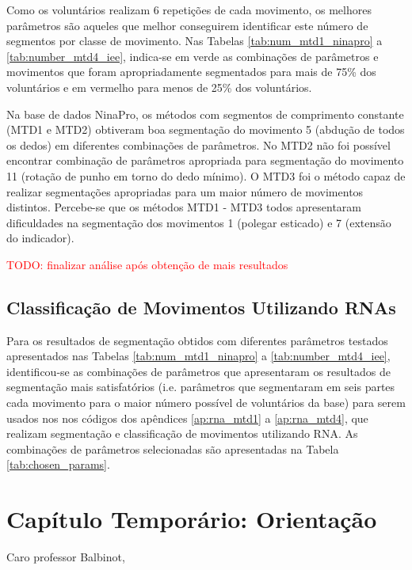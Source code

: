 Como os voluntários realizam 6 repetições de cada movimento, os melhores parâmetros são aqueles que melhor conseguirem identificar este número de segmentos por classe de movimento. Nas Tabelas \ref{tab:num_mtd1_ninapro} a \ref{tab:number_mtd4_iee}, indica-se em verde as combinações de parâmetros e movimentos que foram apropriadamente segmentados para mais de 75\% dos voluntários e em vermelho para menos de 25\% dos voluntários.




Na base de dados NinaPro, os métodos com segmentos de comprimento constante (MTD1 e MTD2) obtiveram boa segmentação do movimento 5 (abdução de todos os dedos) em diferentes combinações de parâmetros. No MTD2 não foi possível encontrar combinação de parâmetros apropriada para segmentação do movimento 11 (rotação de punho em torno do dedo mínimo). O MTD3 foi o método capaz de realizar segmentações apropriadas para um maior número de movimentos distintos. Percebe-se que os métodos MTD1 - MTD3 todos apresentaram dificuldades na segmentação dos movimentos 1 (polegar esticado) e 7 (extensão do indicador).

\textcolor{red}{TODO: finalizar análise após obtenção de mais resultados}

		\section{Classificação de Movimentos Utilizando RNAs}
Para os resultados de segmentação obtidos com diferentes parâmetros testados apresentados nas Tabelas \ref{tab:num_mtd1_ninapro} a \ref{tab:number_mtd4_iee}, identificou-se as combinações de parâmetros que apresentaram os resultados de segmentação mais satisfatórios (i.e. parâmetros que segmentaram em seis partes cada movimento para o maior número possível de voluntários da base) para serem usados nos nos códigos dos apêndices \ref{ap:rna_mtd1} a \ref{ap:rna_mtd4}, que realizam segmentação e classificação de movimentos utilizando RNA. As combinações de parâmetros selecionadas são apresentadas na Tabela \ref{tab:chosen_params}.



	\chapter{Capítulo Temporário: Orientação}
Caro professor Balbinot,


